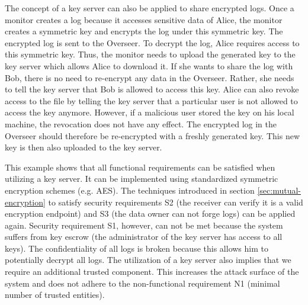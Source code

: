 \documentclass[../main.tex]{subfiles}
\begin{document}
The concept of a key server can also be applied to share encrypted logs.
Once a monitor creates a log because it accesses sensitive data of Alice, the monitor creates a symmetric key and encrypts the log under this symmetric key.
The encrypted log is sent to the Overseer.
To decrypt the log, Alice requires access to this symmetric key.
Thus, the monitor needs to upload the generated key to the key server which allows Alice to download it.
If she wants to share the log with Bob, there is no need to re-encrypt any data in the Overseer.
Rather, she needs to tell the key server that Bob is allowed to access this key.
Alice can also revoke access to the file by telling the key server that a particular user is not allowed to access the key anymore.
However, if a malicious user stored the key on his local machine, the revocation does not have any effect.
The encrypted log in the Overseer should therefore be re-encrypted with a freshly generated key.
This new key is then also uploaded to the key server.

This example shows that all functional requirements can be satisfied when utilizing a key server.
It can be implemented using standardized symmetric encryption schemes (e.g. AES).
The techniques introduced in section \ref{sec:mutual-encryption} to satisfy security requirements S2 (the receiver can verify it is a valid encryption endpoint) and S3 (the data owner can not forge logs) can be applied again.
Security requirement S1, however, can not be met because the system suffers from key escrow (the administrator of the key server has access to all keys).
The confidentiality of all logs is broken because this allows him to potentially decrypt all logs.
The utilization of a key server also implies that we require an additional trusted component.
This increases the attack surface of the system and does not adhere to the non-functional requirement N1 (minimal number of trusted entities).
\end{document}
